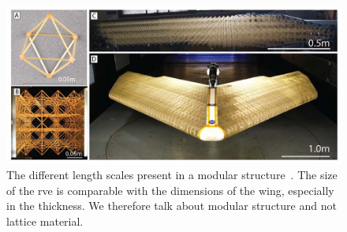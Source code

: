 \begin{figure}
    \centering
    \includegraphics[width=\linewidth]{figures/02_literature/nasa-madcat-morphing-wing-breakdown-1000-x-600(1).jpg}
    \caption{The different length scales present in a modular structure~\cite{cramer_elastic_2019}. The size of the \gls{rve} is comparable with the dimensions of the wing, especially in the thickness. We therefore talk about modular structure and not lattice material.}
    \label{fig:02_madcat}
\end{figure}

